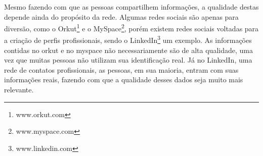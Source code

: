 Mesmo fazendo com que as pessoas compartilhem informações, a qualidade destas depende ainda do propósito da rede. Algumas redes sociais são apenas para diversão, como o Orkut\footnote{www.orkut.com} e o MySpace\footnote{www.myspace.com}, porém existem redes sociais voltadas para a criação de perfis profissionais, sendo o LinkedIn\footnote{www.linkedin.com} um exemplo. As informações contidas no orkut e no myspace não necessariamente são de alta qualidade, uma vez que muitas pessoas não utilizam sua identificação real. Já no LinkedIn, uma rede de contatos profissionais, as pessoas, em sua maioria, entram com suas informações reais, fazendo com que a qualidade desses dados seja muito mais relevante.





